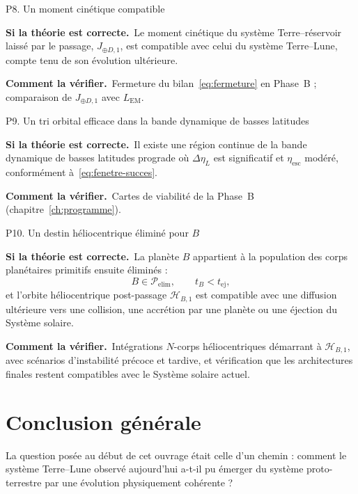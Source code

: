\documentclass[11pt,a4paper,openany]{report}
\newcommand{\sila}{\par\noindent\textbf{Si la théorie est correcte.}\ }
\newcommand{\verif}{\par\smallskip\noindent\textbf{Comment la vérifier.}\ }
\begin{document}
\begin{prediction}{P8. Un moment cinétique compatible}
\sila Le moment cinétique du système Terre--réservoir laissé par le passage, $J_{\oplus D,1}$, est
compatible avec celui du système Terre--Lune, compte tenu de son évolution ultérieure.
\verif Fermeture du bilan~\eqref{eq:fermeture} en Phase~B ; comparaison de $J_{\oplus D,1}$ avec
$L_{\mathrm{EM}}$.
\end{prediction}

\begin{prediction}{P9. Un tri orbital efficace dans la bande dynamique de basses latitudes}
\sila Il existe une région continue de la bande dynamique de basses latitudes prograde où $\Delta\eta_L$ est
significatif et $\eta_{\mathrm{esc}}$ modéré, conformément à~\eqref{eq:fenetre-succes}.
\verif Cartes de viabilité de la Phase~B (chapitre~\ref{ch:programme}).
\end{prediction}

\begin{prediction}{P10. Un destin héliocentrique éliminé pour \texorpdfstring{$B$}{B}}
\sila La planète $B$ appartient à la population des corps planétaires primitifs ensuite éliminés :
\begin{equation}
B\in\mathcal{P}_{\mathrm{elim}},\qquad t_B<t_{\mathrm{ej}},
\label{eq:predB}
\end{equation}
et l'orbite héliocentrique post-passage $\mathcal{H}_{B,1}$ est compatible avec une diffusion
ultérieure vers une collision, une accrétion par une planète ou une éjection du Système solaire.
\verif Intégrations $N$-corps héliocentriques démarrant à $\mathcal{H}_{B,1}$, avec scénarios
d'instabilité précoce et tardive, et vérification que les architectures finales restent compatibles
avec le Système solaire actuel.
\end{prediction}

\chapter*{Conclusion générale}

La question posée au début de cet ouvrage était celle d'un chemin : comment le système
Terre--Lune observé aujourd'hui a-t-il pu émerger du système proto-terrestre par une évolution
physiquement cohérente ?
\end{document}
